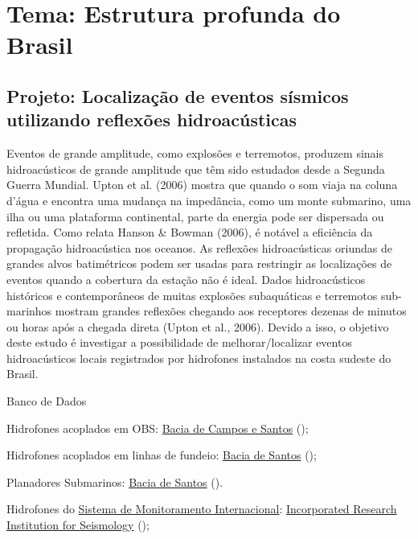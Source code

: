\documentclass[10pt,a4paper,oneside]{book}
\begin{document}
\section{Tema: Estrutura profunda do Brasil}


\subsection{Projeto: Localização de eventos sísmicos utilizando reflexões hidroacústicas}

Eventos de grande amplitude, como explosões e terremotos, produzem sinais hidroacústicos de grande amplitude que têm sido estudados desde a Segunda Guerra Mundial. Upton et al. (2006) mostra que quando o som viaja na coluna d'água e encontra uma mudança na impedância, como um monte submarino, uma ilha ou uma plataforma continental, parte da energia pode ser dispersada ou refletida. Como relata Hanson \& Bowman (2006), é notável a eficiência da propagação hidroacústica nos oceanos. As reflexões hidroacústicas oriundas de grandes alvos batimétricos podem ser usadas para restringir as localizações de eventos quando a cobertura da estação não é ideal. Dados hidroacústicos históricos e contemporâneos de muitas explosões subaquáticas e terremotos sub-marinhos mostram grandes reflexões chegando aos receptores dezenas de minutos ou horas após a chegada direta (Upton et al., 2006). Devido a isso, o objetivo deste estudo é investigar a possibilidade de melhorar/localizar eventos hidroacústicos locais registrados por hidrofones instalados na costa sudeste do Brasil. 

\begin{fancyenum}{\faDatabase}{Banco de Dados}
	\item Hidrofones acoplados em OBS: \href{https://sismo-oceano.ufsc.br/}{Bacia de Campos e Santos} (\faLock);
	\item Hidrofones acoplados em linhas de fundeio: \href{https://comunicabaciadesantos.petrobras.com.br/projeto-de-monitoramento-da-paisagem-acustica-submarina-pmpas-}{Bacia de Santos} (\faLock);
	\item Planadores Submarinos: \href{https://comunicabaciadesantos.petrobras.com.br/projeto-de-monitoramento-da-paisagem-acustica-submarina-pmpas-}{Bacia de Santos} (\faLock).
	\item Hidrofones do \href{https://www.ctbto.org/our-work/international-monitoring-system}{Sistema de Monitoramento Internacional}: \href{https://ds.iris.edu/gmap/\#network=IM\&planet=earth}{Incorporated Research Institution for Seismology} (\faUnlock);
\end{fancyenum}
\end{document}
